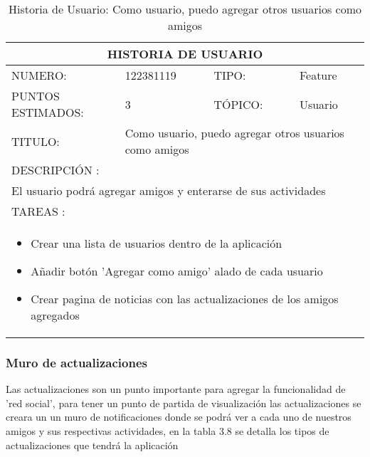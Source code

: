 \begin{table}[h]
\centering
\renewcommand{\arraystretch}{1.4}
\begin{tabular}{|*{4}{l|}}
\hline
\multicolumn{4}{|c|}{HISTORIA DE USUARIO} \\ \hline
NUMERO: & 122381119 & TIPO: & Feature \\ \hline
PUNTOS ESTIMADOS: & 3 & TÓPICO: & Usuario \\ \hline
TITULO: & \multicolumn{3}{|p{7.2cm}|}{ Como usuario, puedo agregar otros usuarios como amigos} \\ \hline
\multicolumn{4}{|l|}{DESCRIPCIÓN : } \\ \hline
\multicolumn{4}{|p{11cm}|}{El usuario podrá agregar amigos y enterarse de sus actividades} \\ \hline
\multicolumn{4}{|l|}{TAREAS : } \\ \hline
\multicolumn{4}{|p{11cm}|}{
\begin{minipage}[t]{\hsize}
  \begin{itemize}
    \item Crear una lista de usuarios dentro de la aplicación
    \item Añadir botón 'Agregar como amigo' alado de cada usuario
    \item Crear pagina de noticias con las actualizaciones de los amigos agregados
  \end{itemize}
\end{minipage}
} \\ \hline
\end{tabular}
\caption{Historia de Usuario: Como usuario, puedo agregar otros usuarios como amigos}
\label{tab:Primero}
\end{table}

\subsubsection{Muro de actualizaciones}

Las actualizaciones son un punto importante para agregar la funcionalidad
de 'red social', para tener un punto de partida de visualización las actualizaciones
se creara un un muro de notificaciones donde se podrá ver a cada uno de nuestros
amigos y sus respectivas actividades, en la tabla 3.8 se detalla los
tipos de actualizaciones que tendrá la aplicación


